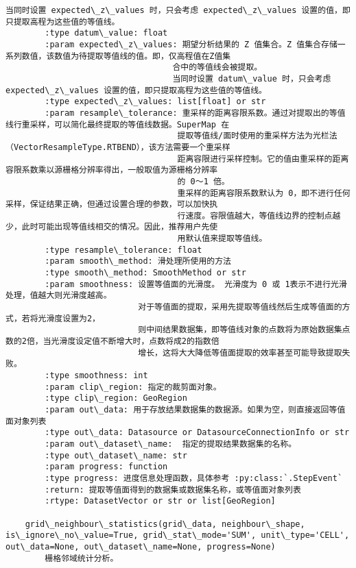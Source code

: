 \documentclass[11pt]{article}
\begin{document}
\begin{Verbatim}[commandchars=\\\{\}]
                            当同时设置 expected\_z\_values 时，只会考虑 expected\_z\_values 设置的值，即只提取高程为这些值的等值线。
        :type datum\_value: float
        :param expected\_z\_values: 期望分析结果的 Z 值集合。Z 值集合存储一系列数值，该数值为待提取等值线的值。即，仅高程值在Z值集
                                  合中的等值线会被提取。
                                  当同时设置 datum\_value 时，只会考虑 expected\_z\_values 设置的值，即只提取高程为这些值的等值线。
        :type expected\_z\_values: list[float] or str
        :param resample\_tolerance: 重采样的距离容限系数。通过对提取出的等值线行重采样，可以简化最终提取的等值线数据。SuperMap 在
                                   提取等值线/面时使用的重采样方法为光栏法（VectorResampleType.RTBEND），该方法需要一个重采样
                                   距离容限进行采样控制。它的值由重采样的距离容限系数乘以源栅格分辨率得出，一般取值为源栅格分辨率
                                   的 0～1 倍。
                                   重采样的距离容限系数默认为 0，即不进行任何采样，保证结果正确，但通过设置合理的参数，可以加快执
                                   行速度。容限值越大，等值线边界的控制点越少，此时可能出现等值线相交的情况。因此，推荐用户先使
                                   用默认值来提取等值线。
        :type resample\_tolerance: float
        :param smooth\_method: 滑处理所使用的方法
        :type smooth\_method: SmoothMethod or str
        :param smoothness: 设置等值面的光滑度。 光滑度为 0 或 1表示不进行光滑处理，值越大则光滑度越高。
                           对于等值面的提取，采用先提取等值线然后生成等值面的方式，若将光滑度设置为2，
                           则中间结果数据集，即等值线对象的点数将为原始数据集点数的2倍，当光滑度设定值不断增大时，点数将成2的指数倍
                           增长，这将大大降低等值面提取的效率甚至可能导致提取失败。
        :type smoothness: int
        :param clip\_region: 指定的裁剪面对象。
        :type clip\_region: GeoRegion
        :param out\_data: 用于存放结果数据集的数据源。如果为空，则直接返回等值面对象列表
        :type out\_data: Datasource or DatasourceConnectionInfo or str
        :param out\_dataset\_name:  指定的提取结果数据集的名称。
        :type out\_dataset\_name: str
        :param progress: function
        :type progress: 进度信息处理函数，具体参考 :py:class:`.StepEvent`
        :return: 提取等值面得到的数据集或数据集名称，或等值面对象列表
        :rtype: DatasetVector or str or list[GeoRegion]
    
    grid\_neighbour\_statistics(grid\_data, neighbour\_shape, is\_ignore\_no\_value=True, grid\_stat\_mode='SUM', unit\_type='CELL', out\_data=None, out\_dataset\_name=None, progress=None)
        栅格邻域统计分析。
        

\end{Verbatim}
\end{document}
